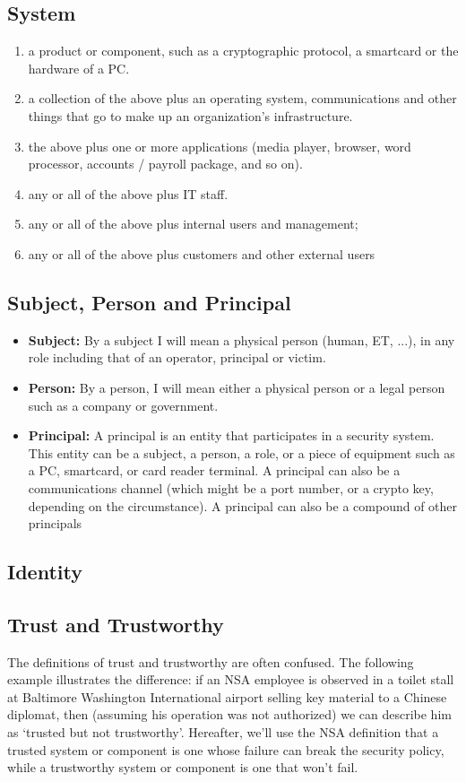 \subsection{System}
	\begin{enumerate}
		\item a product or component, such as a cryptographic protocol, a smartcard
		or the hardware of a PC.
		\item a collection of the above plus an operating system, communications and
		other things that go to make up an organization’s infrastructure.
		\item the above plus one or more applications (media player, browser, word
		processor, accounts / payroll package, and so on).
		\item any or all of the above plus IT staff.
		\item any or all of the above plus internal users and management;
		\item any or all of the above plus customers and other external users
	\end{enumerate}

\subsection{Subject, Person and Principal}
	\begin{itemize}
		\item{\bf Subject:} By a subject I will mean a physical person (human, ET, ...), 
		in any role including that of an operator, principal or victim. 
		\item{\bf Person:} By a person, I will mean either a physical person or a 
		legal person such as a company or government.
		\item{\bf Principal:} A principal is an entity that participates in a security system. 
		This entity can be a subject, a person, a role, or a piece of equipment such as a PC, smartcard, or
		card reader terminal. A principal can also be a communications channel (which
		might be a port number, or a crypto key, depending on the circumstance). A
		principal can also be a compound of other principals
	\end{itemize}

\subsection{Identity} 

\clearpage
\subsection{Trust and Trustworthy} 
	The definitions of trust and trustworthy are often confused. 
	The following example illustrates the difference: if an NSA employee is observed in a toilet
	stall at Baltimore Washington International airport selling key material to a
	Chinese diplomat, then (assuming his operation was not authorized) we can
	describe him as ‘trusted but not trustworthy’. Hereafter, we’ll use the NSA
	definition that a trusted system or component is one whose failure can break the
	security policy, while a trustworthy system or component is one that won’t fail.

